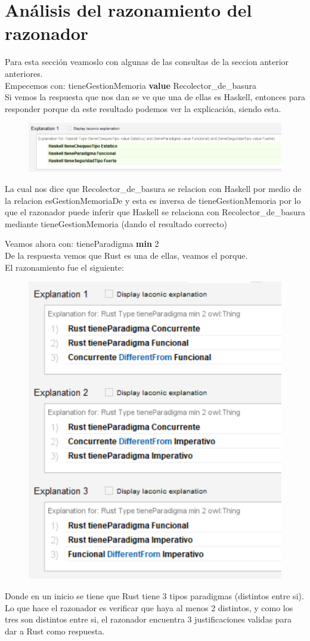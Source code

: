 \documentclass[12pt, titlepage, a4paper]{article}
\newcommand{\high}[2]{{\color{#1} \textbf{#2}}}
\begin{document}
\section{Análisis del razonamiento del razonador}
Para esta sección veamoslo con algunas de las consultas de 
la seccion anterior anteriores.\\

Empecemos con: tieneGestionMemoria \high{magenta}{value} Recolector\_de\_basura\\
Si vemos la  respuesta que nos dan se ve que una de ellas es Haskell,
 entonces para responder porque da este resultado podemos ver la explicación, siendo esta. 
\begin{figure}[H]
    \centering
    \includegraphics[width=.8\textwidth]{Imagenes/Explicacion1.png}
    \caption{}
\end{figure}
La cual nos dice que Recolector\_de\_basura se relacion con Haskell por medio de 
la relacion esGestionMemoriaDe y esta es inversa de tieneGestionMemoria por lo 
que el razonador puede inferir que Haskell se relaciona con Recolector\_de\_basura 
mediante tieneGestionMemoria (dando el resultado correcto)

\noindent Veamos ahora con: tieneParadigma \high{magenta}{min} 2\\
De la respuesta vemos que Rust es una de ellas, veamos el porque.\\
El razonamiento fue el siguiente:
\begin{figure}[H]
    \centering
    \includegraphics[width=.5\textwidth]{Imagenes/Explicacion2.png}
    \caption{}
\end{figure}
Donde en un inicio se tiene que Rust tiene 3 tipos paradigmas (distintos entre si). 
Lo que hace el razonador es verificar que haya al menos 2 distintos, y como 
los tres son distintos entre si, el razonador encuentra 3 justificaciones 
validas para dar a Rust como respuesta.
\end{document}
